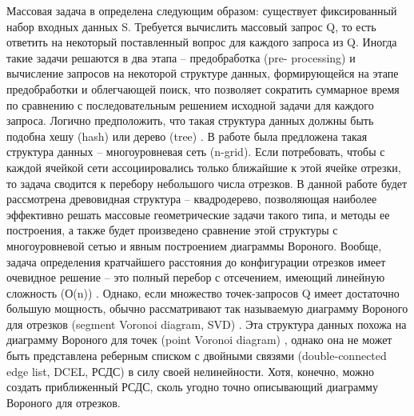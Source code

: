 Массовая задача в \cite{PrSh} определена следующим образом: существует
фиксированный набор входных данных S. Требуется вычислить массовый
запрос Q, то есть ответить на некоторый поставленный вопрос для каждого
запроса из Q. Иногда такие задачи решаются в два этапа – предобработка (pre-
processing) и вычисление запросов на некоторой структуре данных,
формирующейся на этапе предобработки и облегчающей поиск, что позволяет
сократить суммарное время по сравнению с последовательным решением
исходной задачи для каждого запроса.
Логично предположить, что такая структура данных должны быть
подобна хешу (hash) \cite{AHU} или дерево (tree) \cite{QT, SQT, FANN}. В работе \cite{NGRID} была предложена
такая структура данных – многоуровневая сеть (n-grid). Если потребовать,
чтобы с каждой ячейкой сети ассоциировались только ближайшие к этой
ячейке отрезки, то задача сводится к перебору небольшого числа отрезков. В
данной работе будет рассмотрена древовидная структура – квадродерево,
позволяющая наиболее эффективно решать массовые геометрические задачи
такого типа, и методы ее построения, а также будет произведено сравнение
этой структуры с многоуровневой сетью и явным построением диаграммы
Вороного.
Вообще, задача определения кратчайшего расстояния до конфигурации
отрезков имеет очевидное решение – это полный
перебор с отсечением, имеющий линейную сложность (О(n)) \cite{DnCG}. Однако, если
множество точек-запросов Q имеет достаточно большую мощность, обычно
рассматривают так называемую диаграмму Вороного для отрезков (segment
Voronoi diagram, SVD) \cite{PrSh, CGAL}. Эта структура данных похожа на диаграмму
Вороного для точек (point Voronoi diagram) \cite{PrSh, CGAL}, однако она не может быть
представлена реберным списком с двойными связями (double-connected edge
list, DCEL, РСДС) \cite{PrSh, CGAL} в силу своей нелинейности. Хотя, конечно, можно
создать приближенный РСДС, сколь угодно точно описывающий диаграмму
Вороного для отрезков.
